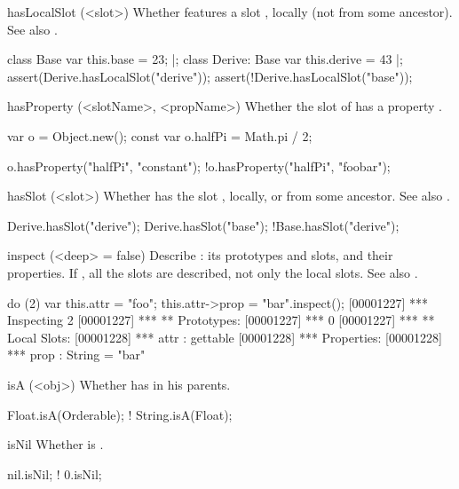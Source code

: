 \begin{urbiscriptapi}
\item[hasLocalSlot](<slot>)%
  Whether \this features a slot , locally (not from some
  ancestor).  See also .
\begin{urbiscript}
class Base         { var this.base = 23; } |;
class Derive: Base { var this.derive = 43 } |;
assert(Derive.hasLocalSlot("derive"));
assert(!Derive.hasLocalSlot("base"));
\end{urbiscript}


\item[hasProperty](<slotName>, <propName>)%
  Whether the slot  of \this has a property .
\begin{urbiassert}
var o = Object.new();
const var o.halfPi = Math.pi / 2;

 o.hasProperty("halfPi", "constant");
!o.hasProperty("halfPi", "foobar");
\end{urbiassert}


\item[hasSlot](<slot>)%
  Whether \this has the slot , locally, or from
  some ancestor.  See also .

\begin{urbiassert}
Derive.hasSlot("derive");
Derive.hasSlot("base");
!Base.hasSlot("derive");
\end{urbiassert}


\item[inspect](<deep> = false)%
  Describe \this: its prototypes and slots, and their
  properties.  If , all the slots are described, not only
  the local slots. See also .
\begin{urbiscript}
do (2) { var this.attr = "foo"; this.attr->prop = "bar"}.inspect();
[00001227] *** Inspecting 2
[00001227] *** ** Prototypes:
[00001227] ***   0
[00001227] *** ** Local Slots:
[00001228] ***   attr : gettable
[00001228] ***     Properties:
[00001228] ***      prop : String = "bar"
\end{urbiscript}


\item[isA](<obj>)%
  Whether \this has  in his parents.
\begin{urbiassert}
   Float.isA(Orderable);
! String.isA(Float);
\end{urbiassert}


\item[isNil]%
  Whether \this is .
\begin{urbiassert}
 nil.isNil;
!  0.isNil;
\end{urbiassert}



\end{urbiscriptapi}
